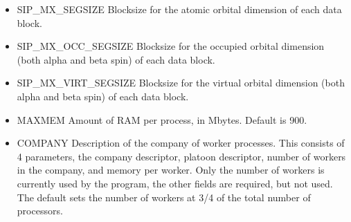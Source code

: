 \documentclass[12pt]{article}
\begin{document}
\begin{itemize} 

\item SIP\_MX\_SEGSIZE Blocksize for the atomic orbital dimension of each data block.

\item SIP\_MX\_OCC\_SEGSIZE Blocksize for the occupied orbital dimension 
                        (both alpha and beta spin) of each data block.
\item SIP\_MX\_VIRT\_SEGSIZE Blocksize for the virtual orbital dimension 
                        (both alpha and beta spin) of each data block.
\item MAXMEM   Amount of RAM per process, in Mbytes. Default is 900.
\item COMPANY  Description of the company of worker processes. This consists of 4 
               parameters, the company descriptor, platoon descriptor, number of workers 
               in the company, and memory per worker. Only the number of workers is currently 
               used by the program, the other fields are required, but not used. The default 
               sets the number of workers at 3/4 of the total number of processors.


\end{itemize}
\end{document}
